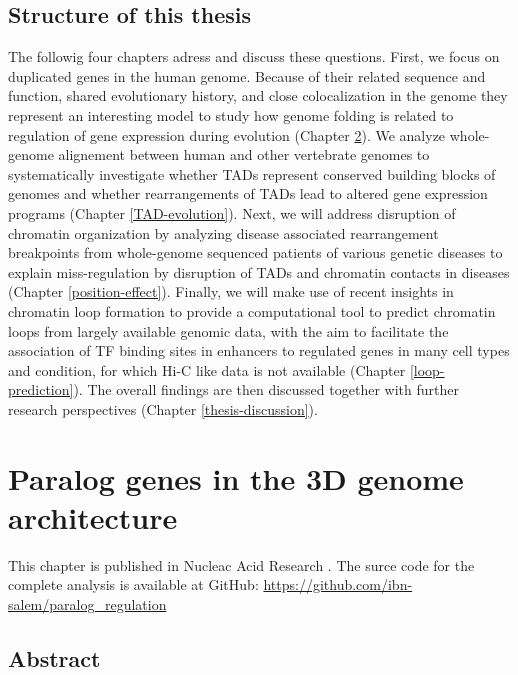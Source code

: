 \documentclass[a4paper,twoside=true,openright,parskip=full,chapterprefix=true,11pt,headings=normal,bibliography=totoc,listof=totoc,titlepage=on,captions=tableabove,draft=false]{scrreprt}
\theoremstyle{definition}
\theoremstyle{definition}
\theoremstyle{definition}
\theoremstyle{remark}
\begin{document}
\section{Structure of this thesis}\label{structure-of-this-thesis}

The followig four chapters adress and discuss these questions. First, we
focus on duplicated genes in the human genome. Because of their related
sequence and function, shared evolutionary history, and close
colocalization in the genome they represent an interesting model to
study how genome folding is related to regulation of gene expression
during evolution (Chapter \ref{paralog-regulation}). We analyze
whole-genome alignement between human and other vertebrate genomes to
systematically investigate whether TADs represent conserved building
blocks of genomes and whether rearrangements of TADs lead to altered
gene expression programs (Chapter \ref{TAD-evolution}). Next, we will
address disruption of chromatin organization by analyzing disease
associated rearrangement breakpoints from whole-genome sequenced
patients of various genetic diseases to explain miss-regulation by
disruption of TADs and chromatin contacts in diseases (Chapter
\ref{position-effect}). Finally, we will make use of recent insights in
chromatin loop formation to provide a computational tool to predict
chromatin loops from largely available genomic data, with the aim to
facilitate the association of TF binding sites in enhancers to regulated
genes in many cell types and condition, for which Hi-C like data is not
available (Chapter \ref{loop-prediction}). The overall findings are then
discussed together with further research perspectives (Chapter
\ref{thesis-discussion}).

\chapter{Paralog genes in the 3D genome
architecture}\label{paralog-regulation}

This chapter is published in Nucleac Acid Research
\citep{Ibn-Salem2017}. The surce code for the complete analysis is
available at GitHub:
\url{https://github.com/ibn-salem/paralog_regulation}

\section*{Abstract}\label{abstract-1}
\end{document}
